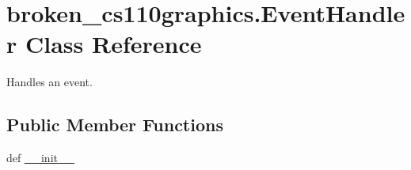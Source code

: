 \hypertarget{classbroken__cs110graphics_1_1EventHandler}{
\section{broken\_\-cs110graphics.EventHandler Class Reference}
\label{classbroken__cs110graphics_1_1EventHandler}
}


Handles an event.  
\subsection*{Public Member Functions}
\begin{DoxyCompactItemize}
\item 
\hypertarget{classbroken__cs110graphics_1_1EventHandler_a6193ff1cd4775b549ca8a5770bd8f898}{
def \hyperlink{classbroken__cs110graphics_1_1EventHandler_a6193ff1cd4775b549ca8a5770bd8f898}{\_\-\_\-init\_\-\_\-}}
\label{classbroken__cs110graphics_1_1EventHandler_a6193ff1cd4775b549ca8a5770bd8f898}


\end{DoxyCompactItemize}
